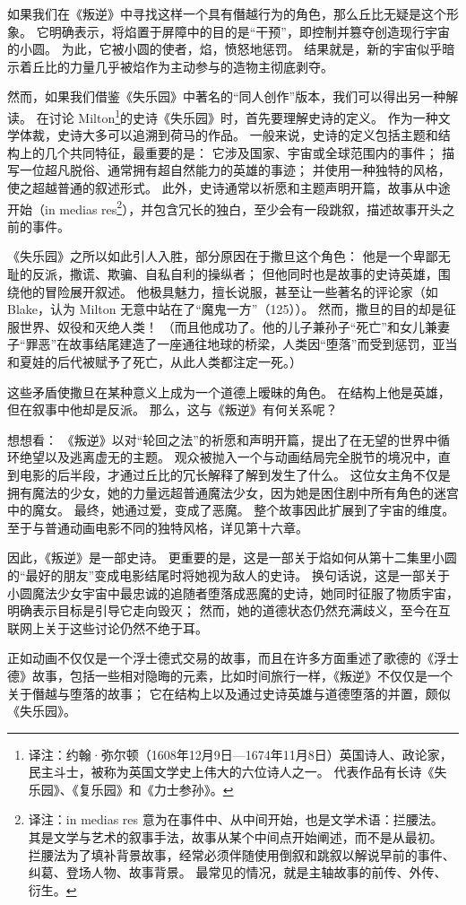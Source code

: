 如果我们在《叛逆》中寻找这样一个具有僭越行为的角色，那么丘比无疑是这个形象。
它明确表示，将焰置于屏障中的目的是“干预”，即控制并篡夺创造现行宇宙的小圆。
为此，它被小圆的使者，焰，愤怒地惩罚。
结果就是，新的宇宙似乎暗示着丘比的力量几乎被焰作为主动参与的造物主彻底剥夺。

然而，如果我们借鉴《失乐园》中著名的“同人创作”版本，我们可以得出另一种解读。
在讨论 Milton\footnote{%
    译注：约翰·弥尔顿（1608年12月9日—1674年11月8日）英国诗人、政论家，民主斗士，被称为英国文学史上伟大的六位诗人之一。
    代表作品有长诗《失乐园》、《复乐园》和《力士参孙》。
}的史诗《失乐园》时，首先要理解史诗的定义。
作为一种文学体裁，史诗大多可以追溯到荷马的作品。
一般来说，史诗的定义包括主题和结构上的几个共同特征，最重要的是：
它涉及国家、宇宙或全球范围内的事件；
描写一位超凡脱俗、通常拥有超自然能力的英雄的事迹；
并使用一种独特的风格，使之超越普通的叙述形式。
此外，史诗通常以祈愿和主题声明开篇，故事从中途开始（in medias res\footnote{%
    译注：in medias res 意为在事件中、从中间开始，也是文学术语：拦腰法。
    其是文学与艺术的叙事手法，故事从某个中间点开始阐述，而不是从最初。
    拦腰法为了填补背景故事，经常必须伴随使用倒叙和跳叙以解说早前的事件、纠葛、登场人物、故事背景。
    最常见的情况，就是主轴故事的前传、外传、衍生。
}），并包含冗长的独白，至少会有一段跳叙，描述故事开头之前的事件。

《失乐园》之所以如此引人入胜，部分原因在于撒旦这个角色：
他是一个卑鄙无耻的反派，撒谎、欺骗、自私自利的操纵者；
但他同时也是故事的史诗英雄，围绕他的冒险展开叙述。
他极具魅力，擅长说服，甚至让一些著名的评论家（如 Blake，认为 Milton 无意中站在了“魔鬼一方”（125））。
然而，撒旦的目的却是征服世界、奴役和灭绝人类！
（而且他成功了。他的儿子兼孙子“死亡”和女儿兼妻子“罪恶”在故事结尾建造了一座通往地球的桥梁，人类因“堕落”而受到惩罚，亚当和夏娃的后代被赋予了死亡，从此人类都注定一死。）

这些矛盾使撒旦在某种意义上成为一个道德上暧昧的角色。
在结构上他是英雄，但在叙事中他却是反派。
那么，这与《叛逆》有何关系呢？

想想看：
《叛逆》以对“轮回之法”的祈愿和声明开篇，提出了在无望的世界中循环绝望以及逃离虚无的主题。
观众被抛入一个与动画结局完全脱节的境况中，直到电影的后半段，才通过丘比的冗长解释了解到发生了什么。
这位女主角不仅是拥有魔法的少女，她的力量远超普通魔法少女，因为她是困住剧中所有角色的迷宫中的魔女。
最终，她通过爱，变成了恶魔。
整个故事因此扩展到了宇宙的维度。
至于与普通动画电影不同的独特风格，详见第十六章。

因此，《叛逆》是一部史诗。
更重要的是，这是一部关于焰如何从第十二集里小圆的“最好的朋友”变成电影结尾时将她视为敌人的史诗。
换句话说，这是一部关于小圆魔法少女宇宙中最忠诚的追随者堕落成恶魔的史诗，她同时征服了物质宇宙，明确表示目标是引导它走向毁灭；
然而，她的道德状态仍然充满歧义，至今在互联网上关于这些讨论仍然不绝于耳。

正如动画不仅仅是一个浮士德式交易的故事，而且在许多方面重述了歌德的《浮士德》故事，包括一些相对隐晦的元素，比如时间旅行一样，《叛逆》不仅仅是一个关于僭越与堕落的故事；
它在结构上以及通过史诗英雄与道德堕落的并置，颇似《失乐园》。
